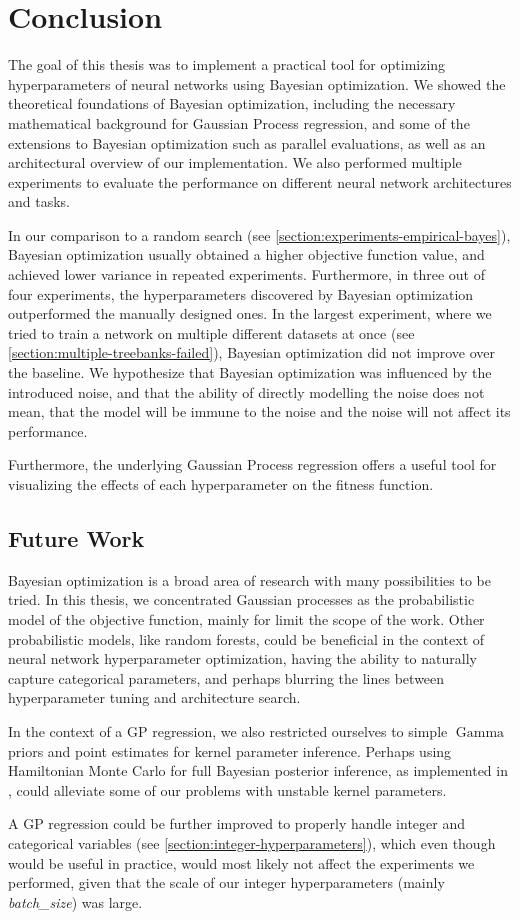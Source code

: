 \chapter{Conclusion}

The goal of this thesis was to implement a practical tool for optimizing
hyperparameters of neural networks using Bayesian optimization. We showed the
theoretical foundations of Bayesian optimization, including the necessary
mathematical background for Gaussian Process regression, and some of the
extensions to Bayesian optimization such as parallel evaluations, as well as an
architectural overview of our implementation. We also performed multiple
experiments to evaluate the performance on different neural network
architectures and tasks.

In our comparison to a random search (see
\autoref{section:experiments-empirical-bayes}), Bayesian optimization usually
obtained a higher objective function value, and achieved lower variance in
repeated experiments. Furthermore, in three out of four experiments, the
hyperparameters discovered by Bayesian optimization outperformed the manually
designed ones. In the largest experiment, where we tried to train a network on
multiple different datasets at once (see
\autoref{section:multiple-treebanks-failed}), Bayesian optimization did not
improve over the baseline. We hypothesize that Bayesian optimization was
influenced by the introduced noise, and that the ability of directly modelling
the noise does not mean, that the model will be immune to the noise and the
noise will not affect its performance.

Furthermore, the underlying Gaussian Process regression offers a useful tool
for visualizing the effects of each hyperparameter on the fitness function.


\section{Future Work}

Bayesian optimization is a broad area of research with many possibilities to be
tried. In this thesis, we concentrated Gaussian processes as the probabilistic
model of the objective function, mainly for limit the scope of the work. Other
probabilistic models, like random forests, could be beneficial in the context
of neural network hyperparameter optimization, having the ability to naturally
capture categorical parameters, and perhaps blurring the lines between
hyperparameter tuning and architecture search.

In the context of a GP regression, we also restricted ourselves to simple
$\operatorname{Gamma}$ priors and point estimates for kernel parameter
inference. Perhaps using Hamiltonian Monte Carlo for full Bayesian posterior
inference, as implemented in \cite{gpy2014}, could alleviate some of our
problems with unstable kernel parameters.

A GP regression could be further improved to properly handle integer and
categorical variables (see \autoref{section:integer-hyperparameters}), which
even though would be useful in practice, would most likely not affect the
experiments we performed, given that the scale of our integer hyperparameters
(mainly \emph{batch\_size}) was large.

